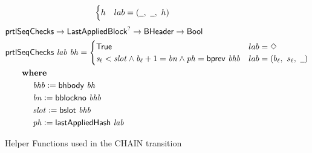 \begin{figure}[htb]
\begin{align*}
\begin{cases}
          h & lab = (\wcard,~\wcard,~h) \\
        \end{cases}
  \end{align*}
  \begin{align*}
      & \fun{prtlSeqChecks} \to \LastAppliedBlock^? \to \BHeader \to \Bool \\
      & \fun{prtlSeqChecks}~\var{lab}~\var{bh} =
        \begin{cases}
          \mathsf{True}
          &
          lab = \Nothing
          \\
          \var{s_\ell} < \var{slot}
          \land \var{b_\ell} + 1 = \var{bn}
          \land \var{ph} = \bprev{bhb}
          &
          lab = (b_\ell,~s_\ell,~\wcard) \\
        \end{cases} \\
      & ~~~~\where \\
      & ~~~~~~~~~~\var{bhb} \leteq \bhbody{bh} \\
      & ~~~~~~~~~~\var{bn} \leteq \bblockno{bhb} \\
      & ~~~~~~~~~~\var{slot} \leteq \bslot{bhb} \\
      & ~~~~~~~~~~\var{ph} \leteq \lastAppliedHash{lab} \\
  \end{align*}

  \caption{Helper Functions used in the CHAIN transition}
  \label{fig:funcs:chain-helper}
\end{figure}

